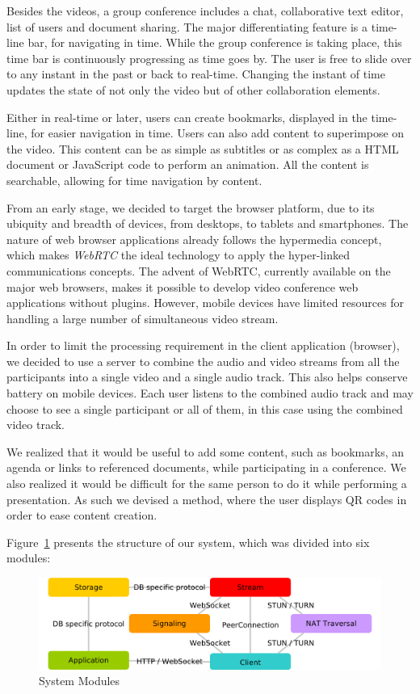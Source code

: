 \documentclass[10pt,conference]{IEEEtran}
\begin{document}
Besides the videos, a group conference includes a chat, collaborative text editor, list of users and document sharing.
The major differentiating feature is a time-line bar, for navigating in time.
While the group conference is taking place, this time bar is continuously progressing as time goes by.
The user is free to slide over to any instant in the past or back to real-time.
Changing the instant of time updates the state of not only the video but of other collaboration elements.

Either in real-time or later, users can create bookmarks, displayed in the time-line, for easier navigation in time.
Users can also add content to superimpose on the video.
This content can be as simple as subtitles or as complex as a \gls{HTML} document or JavaScript code to perform an animation.
All the content is searchable, allowing for time navigation by content.

From an early stage, we decided to target the browser platform, due to its ubiquity and breadth of devices, from desktops, to tablets and smartphones.
The nature of web browser applications already follows the hypermedia concept, which makes \emph{WebRTC} the ideal technology to apply the hyper-linked communications concepts.
The advent of \gls{WebRTC}, currently available on the major web browsers, makes it possible to develop video conference web applications without plugins.
However, mobile devices have limited resources for handling a large number of simultaneous video stream.

In order to limit the processing requirement in the client application (browser), we decided to use a server to combine the audio and video streams from all the participants into a single video and a single audio track.
This also helps conserve battery on mobile devices.
Each user listens to the combined audio track and may choose to see a single participant or all of them, in this case using the combined video track. 

We realized that it would be useful to add some content, such as bookmarks, an agenda or links to referenced documents, while participating in a conference.
We also realized it would be difficult for the same person to do it while performing a presentation.
As such we devised a method, where the user displays \gls{QR} codes in order to ease content creation.


Figure~\ref{fig:modules} presents the structure of our system, which was divided into six modules:


\begin{figure}
	\centering
	\includegraphics[width=\linewidth]{figures/modules2.png}
	\caption{System Modules}
    \label{fig:modules}
\end{figure}
\end{document}
